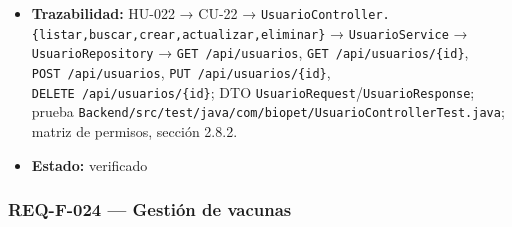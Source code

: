 \documentclass[
  spanish,
]{article}
\begin{document}
\begin{itemize}
  \texttt{crear\allowbreak{}Usuario\allowbreak{}Con\allowbreak{}Campos\allowbreak{}Invalidos\allowbreak{}Devuelve422},
  \texttt{actualizar\allowbreak{}Usuario\allowbreak{}Devuelve200},
  \texttt{actualizar\allowbreak{}Usuario\allowbreak{}Inexistente\allowbreak{}Devuelve404} (criterio 2);
  \texttt{admin\allowbreak{}No\allowbreak{}Puede\allowbreak{}Escalar\allowbreak{}Su\allowbreak{}Propio\allowbreak{}Rol\allowbreak{}Devuelve403} (criterio 3);
  \texttt{eliminar\allowbreak{}Usuario\allowbreak{}Devuelve204\allowbreak{}YBaja\allowbreak{}Logica},
  \texttt{eliminar\allowbreak{}Usuario\allowbreak{}Inexistente\allowbreak{}Devuelve404} (criterio 4);
  \texttt{acceso\allowbreak{}Con\allowbreak{}Rol\allowbreak{}No\allowbreak{}Admin\allowbreak{}Devuelve403},
  \texttt{veterinario\allowbreak{}No\allowbreak{}Puede\allowbreak{}Crear\allowbreak{}Usuarios\allowbreak{}Devuelve403},
  \texttt{acceso\allowbreak{}Sin\allowbreak{}Autenticacion\allowbreak{}Devuelve401} (criterio 5).
\item
  \textbf{Trazabilidad:} HU-022 → CU-22 →
  \texttt{Usuario\allowbreak{}Controller.\allowbreak{}\{listar,\allowbreak{}buscar,\allowbreak{}crear,\allowbreak{}actualizar,\allowbreak{}eliminar\}}
  → \texttt{Usuario\allowbreak{}Service} → \texttt{Usuario\allowbreak{}Repository} →
  \texttt{GET\ /\allowbreak{}api/\allowbreak{}usuarios}, \texttt{GET\ /\allowbreak{}api/\allowbreak{}usuarios/\allowbreak{}\{id\}},
  \texttt{POST\ /\allowbreak{}api/\allowbreak{}usuarios}, \texttt{PUT\ /\allowbreak{}api/\allowbreak{}usuarios/\allowbreak{}\{id\}},
  \texttt{DELETE\ /\allowbreak{}api/\allowbreak{}usuarios/\allowbreak{}\{id\}}; DTO
  \texttt{Usuario\allowbreak{}Request}/\texttt{Usuario\allowbreak{}Response}; prueba
  \texttt{Backend/\allowbreak{}src/\allowbreak{}test/\allowbreak{}java/\allowbreak{}com/\allowbreak{}biopet/\allowbreak{}Usuario\allowbreak{}Controller\allowbreak{}Test.\allowbreak{}java};
  matriz de permisos, sección 2.8.2.
\item
  \textbf{Estado:} verificado
\end{itemize}

\subsubsection{REQ-F-024 --- Gestión de
vacunas}\label{req-f-024-gestiuxf3n-de-vacunas}
\end{document}
